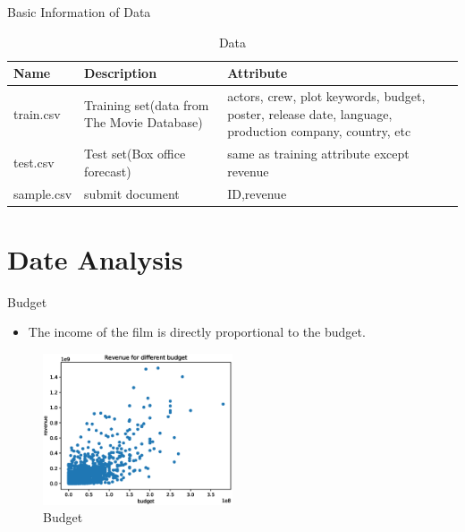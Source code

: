 \documentclass[
 size=14pt,
 paper=smartboard,  %
 mode=present, 		%
 display=slides, 	%
 style=tuliplab,  	%
 pauseslide,
 fleqn,leqno]{powerdot}
\begin{document}
\begin{slide}[toc=,bm=]{Basic Information of Data}
  
  \begin{table}[htbp]
  
    \caption{Data}
  
    \begin{tabular}{p{60pt} p{200pt} p{200pt}}\toprule
     Name & Description  & Attribute \\
         \midrule
         train.csv
         & Training set(data from The Movie Database)  &  actors, crew, plot keywords, budget, poster, release date, language, production company, country, etc \\
         test.csv
         & Test set(Box office forecast) & same as training attribute except revenue \\
         sample.csv
         & submit document & ID,revenue \\
        \bottomrule
   
    \end{tabular}
  
  \end{table}
  

  \bigskip

\end{slide}


\section{Date Analysis}

\begin{slide}{Budget}
  \begin{itemize}
    \item The income of the film is directly proportional to the budget.
  \end{itemize}
  \begin{figure}[htbp]
    \centering
    \includegraphics[width=0.5\textwidth]{figures//budget.eps}
    \caption{Budget}
  \end{figure}
\end{slide}
\end{document}
